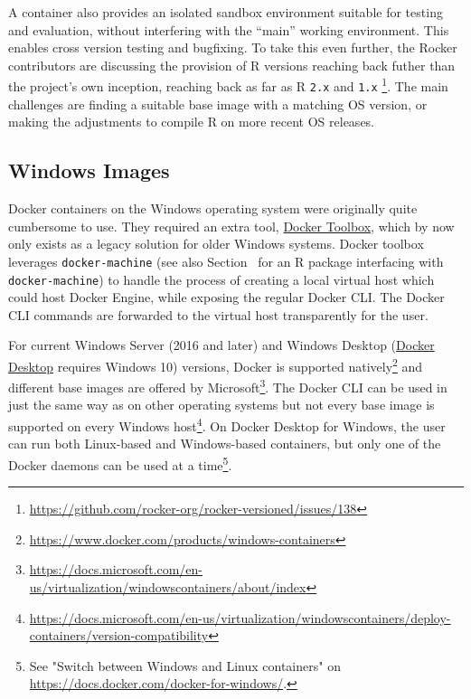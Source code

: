 A container also provides an isolated sandbox environment suitable for
testing and evaluation, without interfering with the ``main'' working
environment. This enables cross version testing and bugfixing. To take
this even further, the Rocker contributors are discussing the provision
of R versions reaching back futher than the project's own inception,
reaching back as far as R \texttt{2.x} and \texttt{1.x}
\footnote{\href{https://github.com/rocker-org/rocker-versioned/issues/138}{https://github.com/rocker-org/rocker-versioned/issues/138}}.
The main challenges are finding a suitable base image with a matching OS
version, or making the adjustments to compile R on more recent OS
releases.

\hypertarget{windows-images}{%
\subsection{Windows Images}\label{windows-images}}

\label{windows}

Docker containers on the Windows operating system were originally quite
cumbersome to use. They required an extra tool,
\href{https://docs.docker.com/toolbox/}{Docker Toolbox}, which by now
only exists as a legacy solution for older Windows systems. Docker
toolbox leverages \texttt{docker-machine} (see also
Section~ for an R package interfacing with
\texttt{docker-machine}) to handle the process of creating a local
virtual host which could host Docker Engine, while exposing the regular
Docker CLI. The Docker CLI commands are forwarded to the virtual host
transparently for the user.

For current Windows Server (2016 and later) and Windows Desktop
(\href{https://www.docker.com/products/docker-desktop}{Docker Desktop}
requires Windows 10) versions, Docker is supported
natively\footnote{\href{https://www.docker.com/products/windows-containers}{https://www.docker.com/products/windows-containers}}
and different base images are offered by
Microsoft\footnote{\href{https://docs.microsoft.com/en-us/virtualization/windowscontainers/about/index}{https://docs.microsoft.com/en-us/virtualization/windowscontainers/about/index}}.
The Docker CLI can be used in just the same way as on other operating
systems but not every base image is supported on every Windows
host\footnote{\href{https://docs.microsoft.com/en-us/virtualization/windowscontainers/deploy-containers/version-compatibility}{https://docs.microsoft.com/en-us/virtualization/windowscontainers/deploy-containers/version-compatibility}}.
On Docker Desktop for Windows, the user can run both Linux-based and
Windows-based containers, but only one of the Docker daemons can be used
at a
time\footnote{See "Switch between Windows and Linux containers" on \href{https://docs.docker.com/docker-for-windows/}{https://docs.docker.com/docker-for-windows/}.}.

